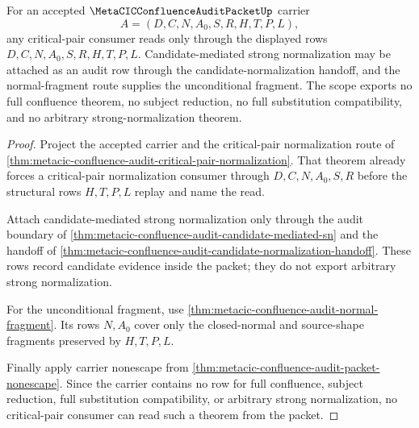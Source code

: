 \begin{theorem}
\label{thm:metacic-confluence-audit-critical-pair-scope}
For an accepted $\MetaCICConfluenceAuditPacketUp$ carrier
$$
A=(D,C,N,A_0,S,R,H,T,P,L),
$$
any critical-pair consumer reads only through the displayed rows $D,C,N,A_0,S,R,H,T,P,L$. Candidate-mediated strong normalization may be attached as an audit row through the candidate-normalization handoff, and the normal-fragment route supplies the unconditional fragment. The scope exports no full confluence theorem, no subject reduction, no full substitution compatibility, and no arbitrary strong-normalization theorem.
\end{theorem}
\begin{proof}
Project the accepted carrier and the critical-pair normalization route of \autoref{thm:metacic-confluence-audit-critical-pair-normalization}. That theorem already forces a critical-pair normalization consumer through $D,C,N,A_0,S,R$ before the structural rows $H,T,P,L$ replay and name the read.

Attach candidate-mediated strong normalization only through the audit boundary of \autoref{thm:metacic-confluence-audit-candidate-mediated-sn} and the handoff of \autoref{thm:metacic-confluence-audit-candidate-normalization-handoff}. These rows record candidate evidence inside the packet; they do not export arbitrary strong normalization.

For the unconditional fragment, use \autoref{thm:metacic-confluence-audit-normal-fragment}. Its rows $N,A_0$ cover only the closed-normal and source-shape fragments preserved by $H,T,P,L$.

Finally apply carrier nonescape from \autoref{thm:metacic-confluence-audit-packet-nonescape}. Since the carrier contains no row for full confluence, subject reduction, full substitution compatibility, or arbitrary strong normalization, no critical-pair consumer can read such a theorem from the packet.
\end{proof}

